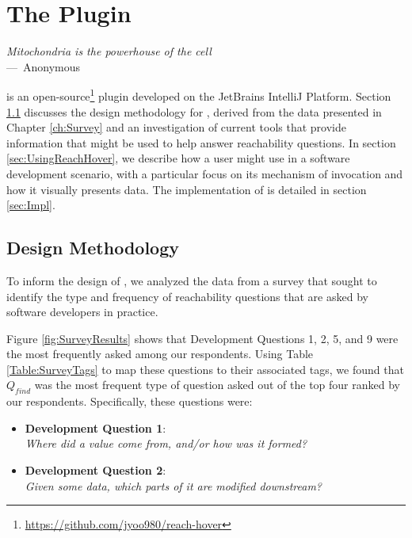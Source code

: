 
\chapter{The \toolname{} Plugin}
\label{ch:Tool}

\begin{epigraph}
  \emph{Mitochondria is the powerhouse of the cell}\\
     ---~Anonymous
\end{epigraph}

\noindent \toolname{} is an open-source\footnote{\url{https://github.com/jyoo980/reach-hover}}
plugin developed on the JetBrains IntelliJ Platform.
Section \ref{sec:DesignMeth} discusses the design methodology for \toolname{},
derived from the data presented in Chapter \ref{ch:Survey} and an investigation
of current tools that provide information that might be used to help answer
reachability questions.
In section \ref{sec:UsingReachHover}, we describe how a user might use
\toolname{} in a software development scenario, with a particular focus on
its mechanism of invocation and how it visually presents data.
The implementation of \toolname{} is detailed in section
\ref{sec:Impl}.

\section{Design Methodology}
\label{sec:DesignMeth}

\noindent To inform the design of \toolname{}, we analyzed the data from a 
survey that sought to identify the type and frequency of reachability questions 
that are asked by software developers in practice.

Figure \ref{fig:SurveyResults} shows that Development Questions 1, 2, 5, and 9
were the most frequently asked among our respondents.
Using Table \ref{Table:SurveyTags} to map these questions to their associated
tags, we found that $Q_{find}$ was the most frequent type of question asked out
of the top four ranked by our respondents.
Specifically, these questions were:

\begin{itemize}
  \item[] \textbf{Development Question 1}:\\ \textit{Where did a value come from,
  and/or how was it formed?}
  \item[] \textbf{Development Question 2}:\\ \textit{Given some data, which
  parts of it are modified downstream?}
\end{itemize}

